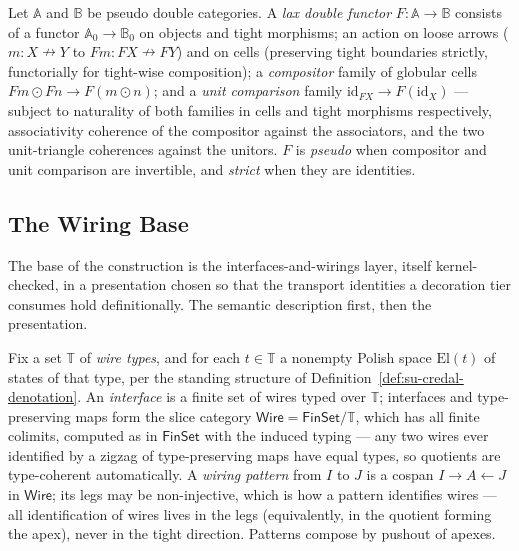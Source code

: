 \begin{definition}
\label{def:su-lax-double-functor}
Let $\mathbb{A}$ and $\mathbb{B}$ be pseudo double categories. A
\emph{lax double functor} $F \colon \mathbb{A} \to \mathbb{B}$
consists of a functor $\mathbb{A}_0 \to \mathbb{B}_0$ on objects and
tight morphisms; an action on loose arrows
($m \colon X \nrightarrow Y$ to
$Fm \colon FX \nrightarrow FY$) and on cells (preserving tight
boundaries strictly, functorially for tight-wise composition); a
\emph{compositor} family of globular cells
$Fm \odot Fn \to F(m \odot n)$; and a \emph{unit comparison} family
$\mathrm{id}_{FX} \to F(\mathrm{id}_X)$ --- subject to naturality of
both families in cells and tight morphisms respectively, associativity
coherence of the compositor against the associators, and the two
unit-triangle coherences against the unitors. $F$ is
\emph{pseudo} when compositor and unit comparison are invertible,
and \emph{strict} when they are identities.
\end{definition}

\subsection{The Wiring Base}

The base of the construction is the
interfaces-and-wirings layer, itself kernel-checked, in a
presentation chosen so
that the transport identities a decoration tier consumes hold
definitionally. The semantic description first, then the
presentation.

\begin{definition}
\label{def:su-wire-category}
Fix a set $\mathbb{T}$ of \emph{wire types}, and for each
$t \in \mathbb{T}$ a nonempty Polish space $\mathrm{El}(t)$ of
states of that type, per the standing structure of
Definition~\ref{def:su-credal-denotation}. An \emph{interface} is a
finite set of wires typed over $\mathbb{T}$; interfaces and
type-preserving maps form the slice category
$\mathsf{Wire} = \mathsf{FinSet}/\mathbb{T}$, which has all finite
colimits, computed as in $\mathsf{FinSet}$ with the induced typing
--- any two wires ever identified by a zigzag of type-preserving
maps have equal types, so quotients are type-coherent automatically.
A \emph{wiring pattern} from $I$ to $J$ is a cospan
$I \to A \leftarrow J$ in $\mathsf{Wire}$; its legs may be
non-injective, which is how a pattern identifies wires --- all
identification of wires lives in the legs (equivalently, in the
quotient forming the apex), never in the tight direction. Patterns
compose by pushout of apexes.
\end{definition}

